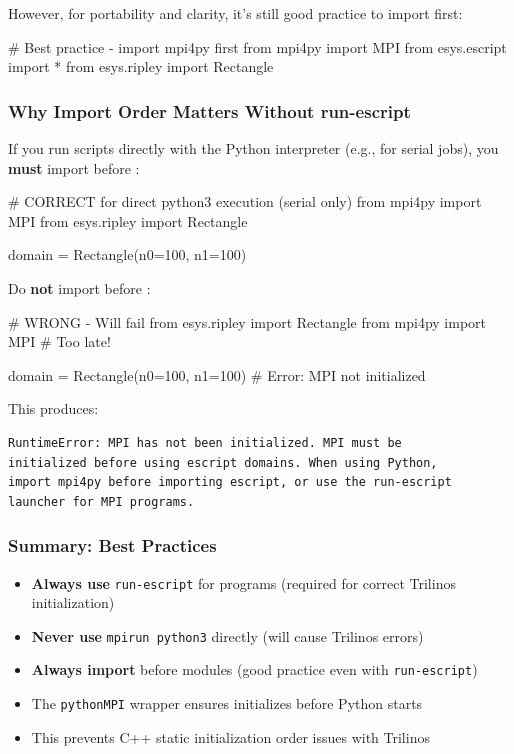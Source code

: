 However, for portability and clarity, it's still good practice to import \mpifo first:

\begin{python}
# Best practice - import mpi4py first
from mpi4py import MPI
from esys.escript import *
from esys.ripley import Rectangle
\end{python}

\subsubsection{Why Import Order Matters Without run-escript}

If you run scripts directly with the Python interpreter (e.g., for serial jobs), you \textbf{must} import \mpifo before \escript:

\begin{python}
# CORRECT for direct python3 execution (serial only)
from mpi4py import MPI
from esys.ripley import Rectangle

domain = Rectangle(n0=100, n1=100)
\end{python}

Do \textbf{not} import \escript before \mpifo:

\begin{python}
# WRONG - Will fail
from esys.ripley import Rectangle
from mpi4py import MPI  # Too late!

domain = Rectangle(n0=100, n1=100)  # Error: MPI not initialized
\end{python}

This produces:
\begin{verbatim}
RuntimeError: MPI has not been initialized. MPI must be
initialized before using escript domains. When using Python,
import mpi4py before importing escript, or use the run-escript
launcher for MPI programs.
\end{verbatim}

\subsubsection{Summary: Best Practices}

\begin{itemize}
\item \textbf{Always use} \texttt{run-escript} for \MPI programs (required for correct Trilinos initialization)
\item \textbf{Never use} \texttt{mpirun python3} directly (will cause Trilinos errors)
\item \textbf{Always import} \mpifo before \escript modules (good practice even with \texttt{run-escript})
\item The \texttt{pythonMPI} wrapper ensures \MPI initializes before Python starts
\item This prevents C++ static initialization order issues with Trilinos
\end{itemize}

